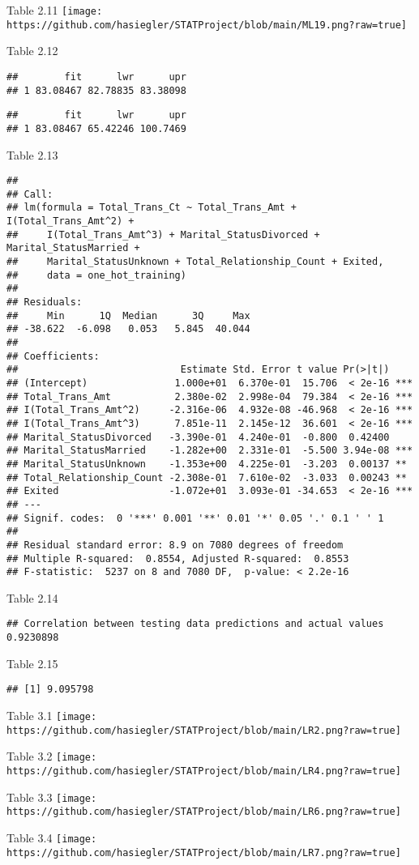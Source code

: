 \documentclass[
]{article}
\begin{document}
Table 2.11
\texttt{[image: https://github.com/hasiegler/STATProject/blob/main/ML19.png?raw=true]}

Table 2.12

\begin{verbatim}
##        fit      lwr      upr
## 1 83.08467 82.78835 83.38098
\end{verbatim}

\begin{verbatim}
##        fit      lwr      upr
## 1 83.08467 65.42246 100.7469
\end{verbatim}

Table 2.13

\begin{verbatim}
## 
## Call:
## lm(formula = Total_Trans_Ct ~ Total_Trans_Amt + I(Total_Trans_Amt^2) + 
##     I(Total_Trans_Amt^3) + Marital_StatusDivorced + Marital_StatusMarried + 
##     Marital_StatusUnknown + Total_Relationship_Count + Exited, 
##     data = one_hot_training)
## 
## Residuals:
##     Min      1Q  Median      3Q     Max 
## -38.622  -6.098   0.053   5.845  40.044 
## 
## Coefficients:
##                            Estimate Std. Error t value Pr(>|t|)    
## (Intercept)               1.000e+01  6.370e-01  15.706  < 2e-16 ***
## Total_Trans_Amt           2.380e-02  2.998e-04  79.384  < 2e-16 ***
## I(Total_Trans_Amt^2)     -2.316e-06  4.932e-08 -46.968  < 2e-16 ***
## I(Total_Trans_Amt^3)      7.851e-11  2.145e-12  36.601  < 2e-16 ***
## Marital_StatusDivorced   -3.390e-01  4.240e-01  -0.800  0.42400    
## Marital_StatusMarried    -1.282e+00  2.331e-01  -5.500 3.94e-08 ***
## Marital_StatusUnknown    -1.353e+00  4.225e-01  -3.203  0.00137 ** 
## Total_Relationship_Count -2.308e-01  7.610e-02  -3.033  0.00243 ** 
## Exited                   -1.072e+01  3.093e-01 -34.653  < 2e-16 ***
## ---
## Signif. codes:  0 '***' 0.001 '**' 0.01 '*' 0.05 '.' 0.1 ' ' 1
## 
## Residual standard error: 8.9 on 7080 degrees of freedom
## Multiple R-squared:  0.8554, Adjusted R-squared:  0.8553 
## F-statistic:  5237 on 8 and 7080 DF,  p-value: < 2.2e-16
\end{verbatim}

Table 2.14

\begin{verbatim}
## Correlation between testing data predictions and actual values 0.9230898
\end{verbatim}

Table 2.15

\begin{verbatim}
## [1] 9.095798
\end{verbatim}

Table 3.1
\texttt{[image: https://github.com/hasiegler/STATProject/blob/main/LR2.png?raw=true]}

Table 3.2
\texttt{[image: https://github.com/hasiegler/STATProject/blob/main/LR4.png?raw=true]}

Table 3.3
\texttt{[image: https://github.com/hasiegler/STATProject/blob/main/LR6.png?raw=true]}

Table 3.4
\texttt{[image: https://github.com/hasiegler/STATProject/blob/main/LR7.png?raw=true]}
\end{document}

